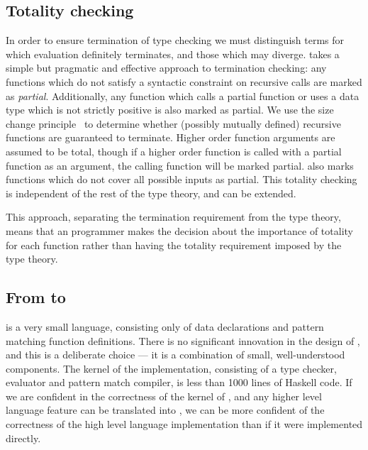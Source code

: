 
\subsection{Totality checking}

In order to ensure termination of type checking we must distinguish terms for
which evaluation definitely terminates, and those which may diverge. \TT{}
takes a simple but pragmatic and effective approach to termination checking:
any functions which do not satisfy a syntactic constraint on recursive calls
are marked as \emph{partial}. Additionally, any function which calls a partial
function or uses a data type which is not strictly positive is also marked as
partial. We use the size change principle~\cite{Lee2001} to determine whether
(possibly mutually defined) recursive functions are guaranteed to
terminate.  Higher order function arguments are assumed to be total, though
if a higher order function is called with a partial function as an argument,
the calling function will be marked partial.
\TT{} also marks functions which do not cover
all possible inputs as partial. This totality checking is independent of the
rest of the type theory, and can be extended.

This approach, separating the termination requirement from the type theory,
means that an \Idris{} programmer makes the decision about the importance of
totality for each function rather than having the totality requirement imposed
by the type theory.

\subsection{From \Idris{} to \TT{}}

\TT{} is a very small language, consisting only of data declarations and pattern matching
function definitions. There is no significant innovation in the design of \TT{}, and this
is a deliberate choice --- it is a combination of small, well-understood components.
The kernel of the \TT{} implementation, consisting of a type checker, evaluator and
pattern match compiler, is less than 1000 lines of Haskell code. If we are confident
in the correctness of the kernel of \TT{}, and any higher level language feature
can be translated into \TT{}, we can be more confident of the correctness of the high
level language implementation than if it were implemented directly.

